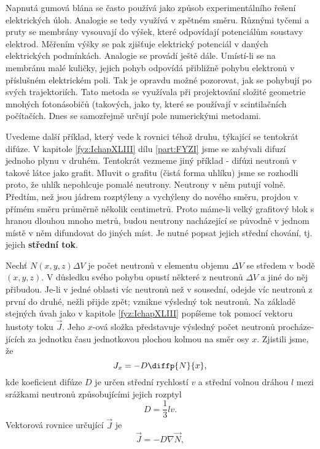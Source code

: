     Napnutá gumová blána se často používá jako způsob experimentálního řešení elektrických úloh.
    Analogie se tedy využívá v zpětném směru. Různými tyčemi a pruty se membrány vysouvají do výšek,
    které odpovídají potenciálům soustavy elektrod. Měřením výšky se pak zjišťuje elektrický
    potenciál v daných elektrických podmínkách. Analogie se provádí ještě dále. Umístí-li se na
    membránu malé kuličky, jejich pohyb odpovídá přibližně pohybu elektronů v příslušném elektrickém
    poli. Tak je opravdu možné pozorovat, jak se  pohybují po svých trajektoriích.
    Tato metoda se využívala při projektování složité geometrie mnohých fotonásobičů (takových, jako
    ty, které se používají v scintilačních počítačích. Dnes se samozřejmě určují pole numerickými
    metodami.

  
    Uvedeme další příklad, který vede k rovnici téhož druhu, týkající se tentokrát difúze. V
    ka­pitole \ref{fyz:IchapXLIII} dílu \ref{part:FYZI} jsme se zabývali difuzí jednoho plynu v
    druhém. Tentokrát vezmeme jiný příklad - difúzi neutronů v takové látce jako grafit. Mluvit o
    grafitu (čistá forma uhlíku) jsme se rozhodli proto, že uhlík nepohlcuje pomalé neutrony.
    Neutrony v něm putují volně. Předtím, než jsou jádrem rozptýleny a vychýleny do nového směru,
    projdou v přímém směru průměrně několik centimetrů. Proto máme-li velký grafitový blok s hranou
    dlouhou mnoho metrů, budou neutrony nacházející se původně v jednom místě v něm difundovat do
    jiných míst. Je nutné popsat jejich střední chování, tj. jejich \textbf{střední tok}.

    Nechť \(N(x, y, z)\Delta V\) je počet neutronů v elementu objemu \(\Delta V\) se středem v bodě
    \((x, y, z)\). V důsledku svého pohybu opustí některé z neutronů \(\Delta V\) a jiné do něj
    přibudou. Je-li v jedné oblasti víc neutronů než v sousední, odejde víc neutronů z první do
    druhé, nežli přijde zpět; vznikne výsledný tok neutronů. Na základě stejných úvah jako v
    kapitole \ref{fyz:IchapXLIII} popíšeme tok pomocí vektoru hustoty toku \(\vec{J}\). Jeho
    \(x\)-ová složka představuje výsledný počet neutronů procháze­jících za jednotku času
    jednotkovou plochou kolmou na směr osy \(x\). Zjistili jsme, že
    \begin{equation*}
      J_x = -D\diffp{N}{x},
    \end{equation*} 
    kde koeficient difúze \(D\) je určen střední rychlostí \(v\) a střední volnou dráhou \(l\) mezi
    srážkami neutronů způsobujícími jejich rozptyl
    \begin{equation*}
      D = \frac{1}{3}lv.
    \end{equation*}
    Vektorová rovnice určující \(\vec{J}\) je
    \begin{equation}\label{fyz:eq775}
      \vec{J} = -D\nabla\vec{N},
    \end{equation} 

